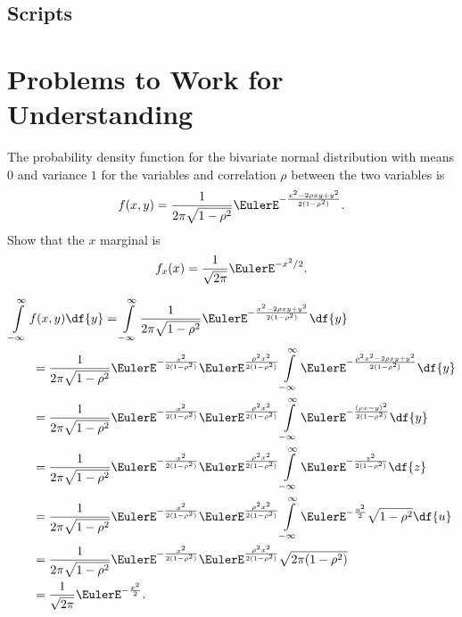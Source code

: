 \documentclass[12pt]{article}
\begin{document}
\subsection*{Scripts}



\hr

\section*{Problems to Work for Understanding}

\renewcommand{\theexerciseseries}{}
\renewcommand{\theexercise}{\arabic{exercise}}

\begin{exercise}
    The probability density function for the bivariate normal
    distribution with means \( 0 \) and variance \( 1 \) for the
    variables and correlation \( \rho \) between the two variables is
    \[
        f(x, y) = \frac{1}{2\pi \sqrt{1 - \rho^2}} \EulerE^{- \frac{x^2
        - 2 \rho x y + y^2}{2(1-\rho^2)}}.
    \] Show that the \( x \) marginal is
    \[
        f_{x}(x) = \frac{1}{\sqrt{2\pi}} \EulerE^{-x^2/2}.
    \]
\end{exercise}
\begin{solution}
    \begin{align*}
        &\int\limits_{-\infty}^{\infty}f(x, y) \df{y} = \int\limits_{-\infty}^
        {\infty}\frac{1}{2\pi \sqrt{1 - \rho^2}} \EulerE^{- \frac{x^2 -
        2 \rho x y + y^2}{2(1-\rho^2)}} \df{y} \\
        &\qquad= \frac{1}{2\pi \sqrt{1 - \rho^2}} \EulerE^{- \frac{x^2}{2
        (1-\rho^2)}} \EulerE^{\frac{\rho^2 x^2}{2(1-\rho^2)}} \int\limits_
        {-\infty}^{\infty} \EulerE^{- \frac{\rho^2 x^2- 2 \rho x y + y^2}
        {2(1-\rho^2)}} \df {y} \\
        &\qquad= \frac{1}{2\pi \sqrt{1 - \rho^2}} \EulerE^{- \frac{x^2}{2
        (1-\rho^2)}} \EulerE^{\frac{\rho^2 x^2}{2(1-\rho^2)}} \int\limits_
        {-\infty}^{\infty} \EulerE^{- \frac{(\rho x - y)^2}{2(1-\rho^2)}}
        \df{y} \\
        &\qquad= \frac{1}{2\pi \sqrt{1 - \rho^2}} \EulerE^{- \frac{x^2}{2
        (1-\rho^2)}} \EulerE^{\frac{\rho^2 x^2}{2(1-\rho^2)}} \int\limits_
        {-\infty}^{\infty} \EulerE^{- \frac{z^2}{2(1-\rho^2)}} \df{z} \\
        &\qquad= \frac{1}{2\pi \sqrt{1 - \rho^2}} \EulerE^{- \frac{x^2}{2
        (1-\rho^2)}} \EulerE^{\frac{\rho^2 x^2}{2(1-\rho^2)}} \int\limits_
        {-\infty}^{\infty} \EulerE^{- \frac{u^2}{2}} \sqrt{1-\rho^2}\df{u}
        \\
        &\qquad= \frac{1}{2\pi \sqrt{1 - \rho^2}} \EulerE^{- \frac{x^2}{2
        (1-\rho^2)}} \EulerE^{\frac{\rho^2 x^2}{2(1-\rho^2)}} \sqrt{2\pi
        (1 - \rho^2)} \\
        &\qquad= \frac{1}{\sqrt{2\pi}} \EulerE^{- \frac{x^2}{2}}.
    \end{align*}
\end{solution}
\end{document}
